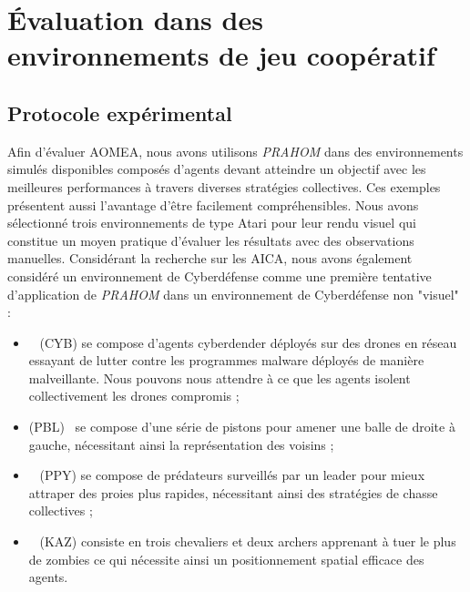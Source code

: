 \documentclass[contribution]{jfsma}
\begin{document}

\section{Évaluation dans des environnements de jeu coopératif}


\subsection{Protocole expérimental}

Afin d'évaluer AOMEA, nous avons utilisons \emph{PRAHOM} dans des environnements simulés disponibles composés d'agents devant atteindre un objectif avec les meilleures performances à travers diverses stratégies collectives. Ces exemples présentent aussi l'avantage d'être facilement compréhensibles.
Nous avons sélectionné trois environnements de type Atari pour leur rendu visuel qui constitue un moyen pratique d'évaluer les résultats avec des observations manuelles\footnotemark[1].
Considérant la recherche sur les AICA, nous avons également considéré un environnement de Cyberdéfense comme une première tentative d'application de \emph{PRAHOM} dans un environnement de Cyberdéfense non "visuel" :


\begin{itemize}
  \item {}~\cite{cage_challenge_3_announcement} (CYB) se compose d'agents cyberdender déployés sur des drones en réseau essayant de lutter contre les programmes malware déployés de manière malveillante. Nous pouvons nous attendre à ce que les agents \allowbreak isolent collectivement les drones compromis ;
  \item {} (PBL)~\cite{Terry2021} se compose d'une série de pistons pour amener une balle de droite à gauche, nécessitant ainsi la représentation des voisins ;
  \item {}~\cite{Lowe2017} (PPY) se compose de prédateurs surveillés par un leader pour mieux attraper des proies plus rapides, nécessitant ainsi des stratégies de chasse collectives ;
  \item {}~\cite{Terry2021} (KAZ) consiste en trois chevaliers et deux archers apprenant à tuer le plus de zombies ce qui nécessite ainsi un positionnement spatial efficace des agents.
\end{itemize}
\end{document}
